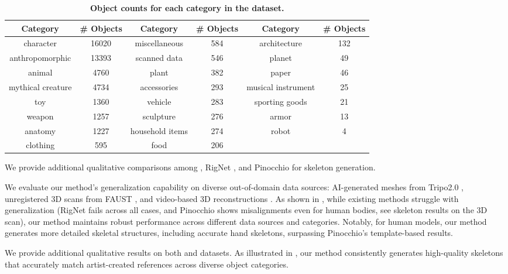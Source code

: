 \begin{table*}[h]
    \centering
    \caption{\textbf{Object counts for each category in the \ourdata{} dataset.}}
    \label{num_obj}
    \begin{tabular}{cccccc}
    \toprule
    Category        & \# Objects & Category        & \# Objects & Category        & \# Objects   \\
    \midrule
    character       & 16020      & miscellaneous & 584  & architecture & 132 \\
    anthropomorphic & 13393      &  scanned data &  546 & planet & 49 \\
    animal          & 4760       & plant  & 382 & paper & 46
    \\
    mythical creature & 4734      &  accessories & 293  &  musical instrument & 25
    \\
    toy         & 1360      & vehicle & 283 &  sporting goods & 21
    \\
    weapon          & 1257       & sculpture & 276 & armor & 13
    \\
    anatomy          & 1227      & household items & 274 & robot & 4
    \\
    clothing          & 595       & food &  206 \\
    \bottomrule
    \end{tabular}
\end{table*}

We provide additional qualitative comparisons among \ours{}, RigNet \cite{xu2020rignet}, and Pinocchio \cite{baran2007automatic} for skeleton generation. 


We evaluate our method's generalization capability on diverse out-of-domain data sources: AI-generated meshes from Tripo2.0 \cite{tripo3d}, unregistered 3D scans from FAUST \cite{bogo2014faust}, and video-based 3D reconstructions \cite{song2024moda}.
As shown in , while existing methods struggle with generalization (RigNet fails across all cases, and Pinocchio shows misalignments even for human bodies, see skeleton results on the 3D scan), our method maintains robust performance across different data sources and categories. Notably, for human models, our method generates more detailed skeletal structures, including accurate hand skeletons, surpassing Pinocchio's template-based results.

We provide additional qualitative results on both \ourdata{} and \res{}  datasets. As illustrated in , our method consistently generates high-quality skeletons that accurately match artist-created references across diverse object categories.

